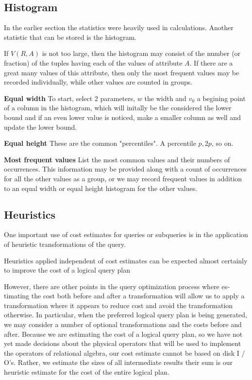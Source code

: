 \subsection{Histogram}
In the earlier section the statistics were heavily used in calculations. Another statistic that can be stored is the histogram.
\par If $V (R, A)$ is not too large, then the histogram may consist of the number (or fraction) of the tuples having each of the values of attribute $A$. If there are a great many values of this attribute, then only the most frequent values may be recorded individually, while other values are counted in groups.
\par \textbf{Equal width} To start, select 2 parameters, $w$ the width and $v_0$ a begining point of a column in the histogram, which will initally be the considered the lower bound and if an even lower value is noticed, make a smaller column as well and update the lower bound.
\par \textbf{Equal height} These are the common "percentiles". A percentile $p, 2p$, so on.
\par \textbf{Most frequent values} List the most common values and their numbers of occurrences. This information may be provided along with a count of occurrences for all the other values as a group, or we may record frequent values in addition to an equal width or equal height histogram for the other values.

\subsection{Heuristics}
One important use of cost estimates for queries or subqueries is in the appli­cation of heuristic transformations of the query.
\par Heuristics applied independent of cost estimates can be expected almost certainly to improve the cost of a logical query plan
\par However, there are other points in the query optimization process where es­timating the cost both before and after a transformation will allow us to apply a transformation where it appears to reduce cost and avoid the transformation otherwise. In particular, when the preferred logical query plan is being generated, we may consider a number of optional transformations and the costs before and after. Because we are estimating the cost of a logical query plan, so we have not yet made decisions about the physical operators that will be used to implement the operators of relational algebra, our cost estimate cannot be based on disk I / O's. Rather, we estimate the sizes of all intermediate results their sum is our heuristic estimate for the cost of the entire logical plan.

